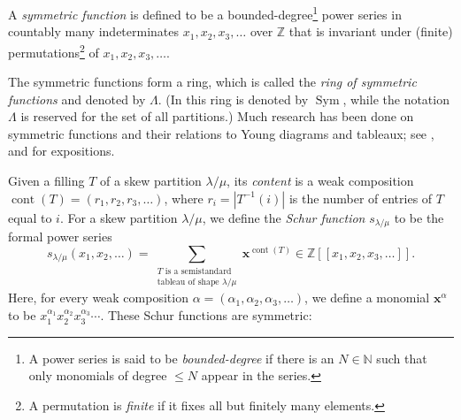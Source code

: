 \documentclass[numbers=enddot,12pt,final,onecolumn,notitlepage]{scrartcl}%
\theoremstyle{definition}
\newenvironment{todo}{}{}
\let\sumnonlimits\sum
\renewcommand{\sum}{\sumnonlimits\limits}
\def\x{{\mathbf{x}}}
\def\lm{{\lambda/\mu}}
\def\Z{{\mathbb{Z}}}
\begin{document}
\begin{comment}
The \textit{symmetric functions} over $\mathbf{k}$ are defined to be the
symmetric bounded-degree power series $f\in\mathbf{k}\left[  \left[
x_{1},x_{2},x_{3},\ldots\right]  \right]  $. They form a $\mathbf{k}%
$-subalgebra of $\mathbf{k}\left[  \left[  x_{1},x_{2},x_{3},\ldots\right]
\right]  $. This $\mathbf{k}$-subalgebra is called the \textit{ring of
symmetric functions over }$\mathbf{k}$; it will be denoted by $\Lambda$ or
(when $\mathbf{k}$ is not clear from the context) by $\Lambda_{\mathbf{k}}$.
(The reader shall be warned that \cite{LamPyl} denotes this $\mathbf{k}%
$-algebra by $\operatorname*{Sym}$, while using the notation $\Lambda$ for the
set of all partitions.) Symmetric functions are a classical
field of research, and are closely related to Young diagrams and tableaux; see
\cite[Chapter 7]{Stan99}, \cite{Macdon95} and \cite[Chapter 2]{GriRei15} for expositions.

\begin{todo}
 Decide whether we want to work over $\Z$ or over an arbitrary commutative field $\mathbf{k}$ with unity. 
\end{todo}
\end{comment}


A \textit{symmetric function} is defined to be a
bounded-degree\footnote{A power series is said to be \textit{bounded-degree}
if there is an $N \in \mathbb{N}$ such that only monomials of degree $\leq N$
appear in the series.}
power series in countably many indeterminates $x_1,x_2,x_3,\dots$
over $\Z$ that is invariant under (finite)
permutations\footnote{A permutation is \textit{finite} if it fixes all but
finitely many elements.} of $x_1,x_2,x_3,\dots$.

The symmetric functions form a ring, which is called the \textit{ring of
symmetric functions} and denoted by $\Lambda$.
(In \cite{LamPyl} this ring is denoted by $\operatorname*{Sym}$, while the notation $\Lambda$ is reserved for the
set of all partitions.) Much research has been done on symmetric functions and
their relations to Young diagrams and tableaux; see
\cite[Chapter 7]{Stan99}, \cite{Macdon95} and \cite[Chapter 2]{GriRei15} for expositions. 




 Given a filling $T$ of a skew partition $\lm$, its \textit{content} is a weak composition $\operatorname*{cont}\left(  T\right)=\left(r_1,r_2,r_3,\dots\right)$, where $r_i=\left|T^{-1}(i)\right|$ is the number of entries of $T$ equal to $i$. For a skew partition $\lambda/\mu$, we define the \textit{Schur function}
$s_{\lambda/\mu}$ to be the formal power series 
\[
s_\lm(x_1,x_2,\dots)
= \sum_{\substack{T\text{ is a semistandard}\\\text{tableau of shape } \lm}}
\mathbf{x}^{\operatorname*{cont}\left(  T\right)  }
\in \Z\left[\left[x_1,x_2,x_3,\ldots\right]\right] .
\]
Here, for every weak composition $\alpha = \left(\alpha_1, \alpha_2, \alpha_3, \ldots\right)$, we define a monomial $\x^\alpha$ to be $x_1^{\alpha_1} x_2^{\alpha_2} x_3^{\alpha_3} \cdots$.
These Schur functions are symmetric:
\end{document}
